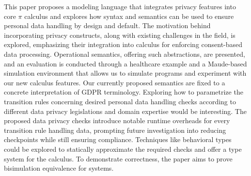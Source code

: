 This paper proposes a modeling language that integrates privacy features into core $\pi $ calculus and explores how syntax and semantics can be used to ensure personal data handling by design and default. The motivation behind incorporating privacy constructs, along with existing challenges in the field, is explored, emphasizing their integration into calculus for enforcing consent-based data processing. Operational semantics, offering such abstractions, are presented, and an evaluation is conducted through a healthcare example and a Maude-based simulation environment that allows us to simulate programs and experiment with our new calculus features. Our currently proposed semantics are fixed to a concrete interpretation of GDPR terminology. Exploring how to parametrize the transition rules concerning desired personal data handling checks according to different data privacy legislations and domain expertise would be interesting. The proposed data privacy checks introduce notable runtime overheads for every transition rule handling data, prompting future investigation into reducing checkpoints while still ensuring compliance. Techniques like behavioral types ~\cite{BehaviouralTypes2016} could be explored to statically approximate the required checks and offer a type system for the calculus. To demonstrate correctness, the paper aims to prove bisimulation equivalence for systems.